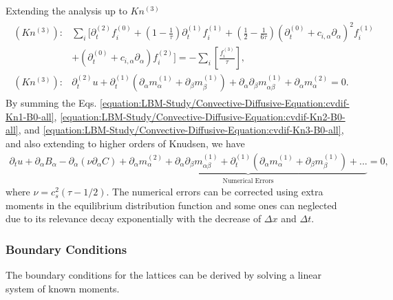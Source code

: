 \documentclass[letterpaper,10pt,english,openany,oneside]{jupyterBook}
\begin{document}
\sphinxAtStartPar
Extending the analysis up to \(Kn^{(3)}\)
\begin{equation}\label{equation:LBM-Study/Convective-Diffusive-Equation:cvdif-Kn3-B0-all}
\begin{split}
\begin{array}{ll}
(Kn^{(3)}):& \displaystyle\sum_{i}\Bigg[ \partial_{t}^{(2)} f_{i}^{(0)} + \left(1-\displaystyle\frac{1}{\tau}\right)\partial_{t}^{(1)} f_{i}^{(1)} + \displaystyle\left(\frac{1}{2} - \frac{1}{6\tau}\right) \left( \partial_{t}^{(0)} + c_{i,\alpha}\partial_{\alpha} \right)^{2} f_{i}^{(1)} \\
& + \left( \partial_{t}^{(0)} + c_{i,\alpha}\partial_{\alpha} \right)f_{i}^{(2)} \Bigg] =  - \displaystyle\sum_{i}\left[\displaystyle\frac{f_{i}^{(3)}}{\tau} \right], \\
(Kn^{(3)}):& \partial_{t}^{(2)} u + \partial_{t}^{(1)}\left(\partial_{\alpha} m^{(1)}_{\alpha} + \partial_{\beta} m^{(1)}_{\beta}\right) + \partial_{\alpha}\partial_{\beta} m^{(1)}_{\alpha\beta} + \partial_{\alpha} m^{(2)}_{\alpha} = 0.
\end{array}
\end{split}
\end{equation}
\sphinxAtStartPar
By summing the Eqs. \eqref{equation:LBM-Study/Convective-Diffusive-Equation:cvdif-Kn1-B0-all}, \eqref{equation:LBM-Study/Convective-Diffusive-Equation:cvdif-Kn2-B0-all}, and \eqref{equation:LBM-Study/Convective-Diffusive-Equation:cvdif-Kn3-B0-all}, and also extending to higher orders of Knudsen, we have
\begin{equation*}
\begin{split}
\partial_{t}  u + \partial_{\alpha} B_{\alpha} - \partial_{\alpha}\left(\nu \partial_{\alpha} C \right) + \underbrace{\partial_{\alpha} m^{(2)}_{\alpha} + \partial_{\alpha}\partial_{\beta} m^{(1)}_{\alpha\beta} + \partial_{t}^{(1)}\left(\partial_{\alpha} m^{(1)}_{\alpha} + \partial_{\beta} m^{(1)}_{\beta}\right) + ...  }_{\textrm{Numerical Errors}} =0,
\end{split}
\end{equation*}
\sphinxAtStartPar
where \(\nu=c_{s}^{2}(\tau-1/2)\). The numerical errors can be corrected using extra moments in the equilibrium distribution function and some ones can neglected due to its relevance decay exponentially with the decrease of \(\Delta x\) and \(\Delta t\).




\subsubsection{Boundary Conditions}
\label{\detokenize{LBM-Study/Convective-Diffusive-Equation:boundary-conditions}}
\sphinxAtStartPar
The boundary conditions for the lattices can be derived by solving a linear system of known moments.
\end{document}
